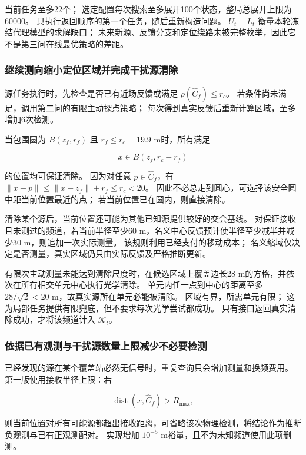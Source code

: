 当前任务至多22个；
选定配置每次搜索至多展开100个状态，整局总展开上限为60000。
只执行返回顺序的第一个任务，随后重新构造问题。
\(U_t-L_t\) 衡量本轮冻结代理模型的求解缺口；
未来新源、反馈分支和定位绕路未被完整枚举，因此它不是第三问在线最优策略的差距。

\subsubsection{继续测向缩小定位区域并完成干扰源清除}\label{sec:q3-4}

源任务执行时，先检查是否已有近场反馈或满足 \(\rho(\widehat C_f)\le r_c\)。
若条件尚未满足，调用第二问的有限主动探点策略；
每次得到真实反馈后重新计算区域，至多增加6次检测。

当包围圆为 \(B(z_f,r_f)\) 且 \(r_f\le r_c=19.9\) m时，所有满足

\begin{equation}\label{eq:q3-11}
x\in B(z_f,r_c-r_f)
\end{equation}

的位置均可保证清除。
因为对任意 \(p\in\widehat C_f\)，有 \(\|x-p\|\le\|x-z_f\|+r_f\le r_c<20\)。
因此不必总走到圆心，可选择该安全圆中距当前位置最近的点；
若当前位置已在圆内，则直接清除。

清除某个源后，当前位置还可能为其他已知源提供较好的交会基线。
对保证接收且未测过的频道，若当前半径至少60 m，名义中心反馈预计使半径至少减半并减少30 m，则追加一次实际测量。
该规则利用已经支付的移动成本；
名义缩域仅决定是否测量，真实区域仍只由实际反馈及严格推断更新。

有限次主动测量未能达到清除尺度时，在候选区域上覆盖边长28 m的方格，并依次在所有相交单元中心执行光学清除。
单元内任一点到中心的距离至多 \(28/\sqrt2<20\) m，故真实源所在单元必能被清除。
区域有界，所需单元有限；
这为局部任务提供有限兜底，但不要求每次光学尝试都成功。
只有接口返回真实清除成功，才将该频道计入 \(\mathcal K_t\)。

\subsubsection{依据已有观测与干扰源数量上限减少不必要检测}\label{sec:q3-5}

已经发现的源在某个覆盖站必然无信号时，重复查询只会增加测量和换频费用。
第一版使用接收半径上限：若

\begin{equation}\label{eq:q3-12}
\operatorname{dist}(x,\widehat C_f)>R_{\max},
\end{equation}

则当前位置对所有可能源都超出接收距离，可省略该次物理检测，将结论作为推断负观测与已有正观测配对。
实现增加 \(10^{-5}\) m裕量，且不为未知频道使用此项删测。

